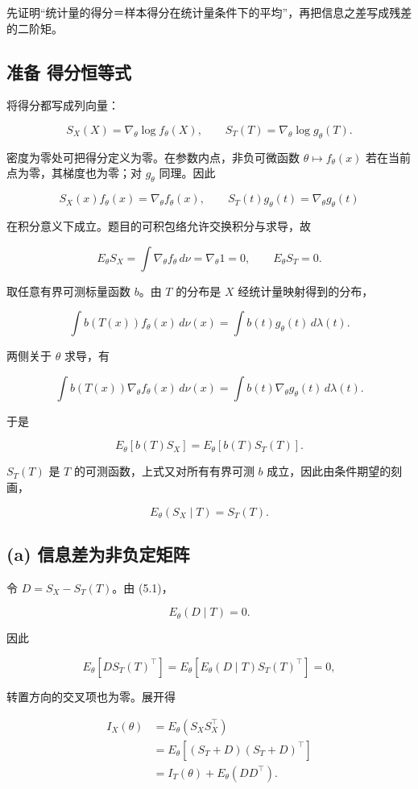  先证明“统计量的得分＝样本得分在统计量条件下的平均”，再把信息之差写成残差的二阶矩。

\subsection{准备 得分恒等式}

将得分都写成列向量：

\[
S_X(X)=\nabla_\theta\log f_\theta(X),\qquad
S_T(T)=\nabla_\theta\log g_\theta(T).
\]

密度为零处可把得分定义为零。在参数内点，非负可微函数 $\theta\mapsto f_\theta(x)$ 若在当前点为零，其梯度也为零；对 $g_\theta$ 同理。因此

\[
S_X(x)f_\theta(x)=\nabla_\theta f_\theta(x),\qquad
S_T(t)g_\theta(t)=\nabla_\theta g_\theta(t)
\]

在积分意义下成立。题目的可积包络允许交换积分与求导，故

\[
E_\theta S_X
=\int\nabla_\theta f_\theta\,d\nu
=\nabla_\theta1=0,
\qquad E_\theta S_T=0.
\]

取任意有界可测标量函数 $b$。由 $T$ 的分布是 $X$ 经统计量映射得到的分布，

\[
\int b(T(x))f_\theta(x)\,d\nu(x)
=\int b(t)g_\theta(t)\,d\lambda(t).
\]

两侧关于 $\theta$ 求导，有

\[
\int b(T(x))\nabla_\theta f_\theta(x)\,d\nu(x)
=\int b(t)\nabla_\theta g_\theta(t)\,d\lambda(t).
\]

于是

\[
E_\theta[b(T)S_X]=E_\theta[b(T)S_T(T)].
\]

$S_T(T)$ 是 $T$ 的可测函数，上式又对所有有界可测 $b$ 成立，因此由条件期望的刻画，

\[
\boxed{E_\theta(S_X\mid T)=S_T(T).}
\tag{5.1}
\]

\subsection{(a) 信息差为非负定矩阵}

令 $D=S_X-S_T(T)$。由 (5.1)，

\[
E_\theta(D\mid T)=0.
\]

因此

\[
E_\theta[D S_T(T)^\top]
=E_\theta[E_\theta(D\mid T)S_T(T)^\top]=0,
\]

转置方向的交叉项也为零。展开得

\[
\begin{aligned}
I_X(\theta)
&=E_\theta(S_XS_X^\top)\\
&=E_\theta[(S_T+D)(S_T+D)^\top]\\
&=I_T(\theta)+E_\theta(DD^\top).
\end{aligned}
\]


